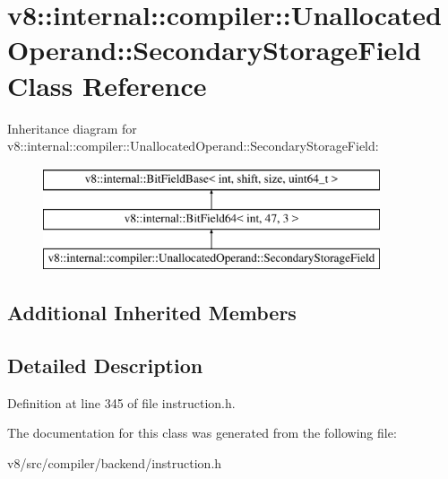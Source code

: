 \hypertarget{classv8_1_1internal_1_1compiler_1_1UnallocatedOperand_1_1SecondaryStorageField}{}\section{v8\+:\+:internal\+:\+:compiler\+:\+:Unallocated\+Operand\+:\+:Secondary\+Storage\+Field Class Reference}
\label{classv8_1_1internal_1_1compiler_1_1UnallocatedOperand_1_1SecondaryStorageField}
Inheritance diagram for v8\+:\+:internal\+:\+:compiler\+:\+:Unallocated\+Operand\+:\+:Secondary\+Storage\+Field\+:\begin{figure}[H]
\begin{center}
\leavevmode
\includegraphics[height=3.000000cm]{classv8_1_1internal_1_1compiler_1_1UnallocatedOperand_1_1SecondaryStorageField}
\end{center}
\end{figure}
\subsection*{Additional Inherited Members}


\subsection{Detailed Description}


Definition at line 345 of file instruction.\+h.



The documentation for this class was generated from the following file\+:\begin{DoxyCompactItemize}
\item 
v8/src/compiler/backend/instruction.\+h\end{DoxyCompactItemize}
